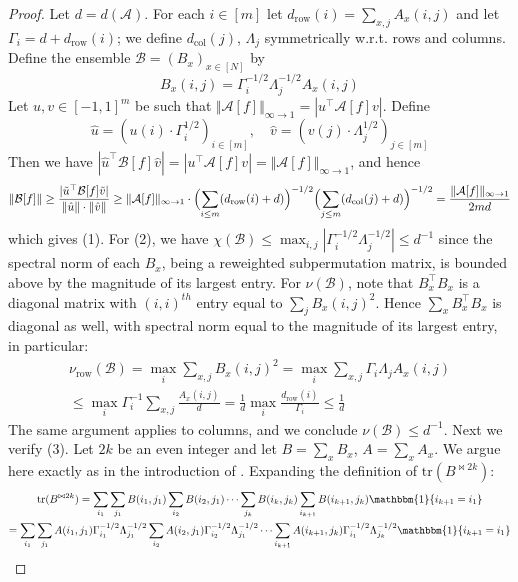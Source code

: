 \documentclass[11pt]{article}
\newcommand{\norm}[1]{\Vert #1 \Vert}
\newcommand{\N}{[N]}
\begin{document}
\begin{proof}
Let $d = d(\mathcal{A})$. For each $i \in [m]$ let $d_\mathrm{row}(i) = \sum_{x,j} A_x(i,j)$ and let $\Gamma_i = d + d_\mathrm{row}(i)$; we define $d_\mathrm{col}(j)$, $\Lambda_j$ symmetrically w.r.t. rows and columns. Define the ensemble $\mathcal{B}=(B_x)_{x \in \N}$ by
\[
B_x(i,j) = \Gamma_i^{-1/2}\Lambda_j^{-1/2} A_x(i,j)
\]
Let $u,v \in [-1,1]^{m}$ be such that $\norm{\mathcal{A}[f]}_{\infty \to 1} = |u^\top \mathcal{A}[f] v|$. Define 
\[
\hat{u} = (u(i) \cdot \Gamma_i^{1/2})_{i \in [m]}, \quad \hat{v} = (v(j) \cdot \Lambda_j^{1/2})_{j \in [m]}
\]
Then we have $|\hat{u}^\top \mathcal{B}[f] \hat{v}|= |u^\top \mathcal{A}[f] v | = \norm{\mathcal{A}[f]}_{\infty\to 1}$, and hence
\[
\norm{\mathcal{B}[f]} \geq  \frac{| \tilde{u}^\top \mathcal{B}[f] \tilde{v}|}{\norm{\hat{u}}\cdot \norm{\hat{v}}} \geq  \norm{\mathcal{A}[f]}_{\infty \to 1} \cdot \Bigl(\sum_{i \leq m} (d_\mathrm{row}(i) + d) \Bigr)^{-1/2} \Bigl(\sum_{j \leq m} (d_\mathrm{col}(j) + d) \Bigr)^{-1/2} = \frac{\norm{\mathcal{A}[f]}_{\infty \to 1}}{2md}
\]
which gives (1). For (2), we have $\chi(\mathcal{B}) \leq \max_{i,j}|\Gamma_i^{-1/2} \Lambda_j^{-1/2}| \leq d^{-1}$ since the spectral norm of each $B_x$, being a reweighted subpermutation matrix, is bounded above by the magnitude of its largest entry. For $\nu(\mathcal{B})$, note that $B^\top_x B_x$ is a diagonal matrix with $(i,i)^{th}$ entry equal to $\sum_{j} B_x(i,j)^2$. Hence $\sum_x B^\top_x B_x$ is diagonal as well, with spectral norm equal to the magnitude of its largest entry, in particular:
\begin{gather}
\nu_\mathrm{row}(\mathcal{B})  =  \max_{i} \sum_{x,j} B_x(i,j)^2  = \max_{i} \sum_{x,j} \Gamma_i \Lambda_j A_x(i,j)\\\leq  \max_{i} \Gamma_i^{-1}\sum_{x,j} \frac{A_x(i,j)}{d }
= \frac{1}{d} \max_i \frac{d_{\mathrm{row}}(i)}{\Gamma_i} \leq \frac{1}{d}
\end{gather}
The same argument applies to columns, and we conclude $\nu(\mathcal{B}) \leq d^{-1}$.
Next we verify (3). Let $2k$ be an even integer and let $B = \sum_x B_x$, $A = \sum_x A_x$. We argue here exactly as in the introduction of \cite{simpler-moore}. Expanding the definition of $\mathrm{tr}({B}^{\bowtie 2k})$:
\begin{gather*}
\mathrm{tr}(B^{\bowtie 2k})  
 = \sum_{i_1} \sum_{j_1} B(i_1,j_1)  \sum_{i_2} B(i_2,j_1) \cdots \sum_{j_k} B(i_k,j_k) \sum_{i_{k+1}} B(i_{k+1},j_k) \mathbbm{1}\{i_{k+1}=i_1\}\\
  = \sum_{i_1} \sum_{j_1} A(i_1,j_1) \Gamma_{i_1}^{-1/2} \Lambda_{j_1}^{-1/2}  \sum_{i_2} A(i_2,j_1)  \Gamma_{i_2}^{-1/2} \Lambda_{j_1}^{-1/2}\cdots \sum_{i_{k+1}} A(i_{k+1},j_k) \Gamma_{i_{1}}^{-1/2} \Lambda_{j_k}^{-1/2} \mathbbm{1}\{i_{k+1} = i_1\}\\

\end{gather*}
\end{proof}
\end{document}
